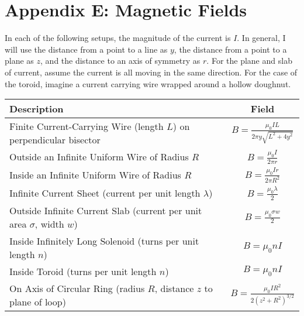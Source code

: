 \section*{Appendix E: Magnetic Fields}
In each of the following setups, the magnitude of the current is $I$. In general, I will use the distance from a point to a line as $y$, the distance from a point to a plane as $z$, and the distance to an axis of symmetry as $r$. For the plane and slab of current, assume the current is all moving in the same direction. For the case of the toroid, imagine a current carrying wire wrapped around a hollow doughnut. 
\begin{center}
	\begin{tabular}{p{10cm} c}
		\centering Description & Field \\ \hline \hline \noalign{\smallskip}
		\centering Finite Current-Carrying Wire (length $L$) on perpendicular bisector& $B = \frac{\mu_0IL}{2\pi y\sqrt{L^2 + 4y^2}}$\\[3pt]  \hline \noalign{\smallskip}
		\centering Outside an Infinite Uniform Wire of Radius $R$ & $B = \frac{\mu_0I}{2\pi r}$\\[3pt]  \hline \noalign{\smallskip}
		\centering Inside an Infinite Uniform Wire of Radius $R$ & $B = \frac{\mu_0Ir}{2\pi R^2}$\\[3pt]  \hline \noalign{\smallskip}
		\centering Infinite Current Sheet (current per unit length $\lambda$) & $B = \frac{\mu_0 \lambda}{2}$\\[3pt]  \hline \noalign{\smallskip}
		\centering Outside Infinite Current Slab (current per unit area $\sigma$, width $w$) & $B = \frac{\mu_0\sigma w}{2}$\\[3pt]  \hline \noalign{\smallskip}
		\centering Inside Infinitely Long Solenoid (turns per unit length $n$) & $B = \mu_0nI$\\[3pt]  \hline \noalign{\smallskip}
		\centering Inside Toroid (turns per unit length $n$) & $B = \mu_0 nI$\\[3pt]  \hline \noalign{\smallskip}
		\centering On Axis of Circular Ring (radius $R$, distance $z$ to plane of loop) & $B = \frac{\mu_0 IR^2}{2(z^2+R^2)^{3/2}}$\\[3pt]  \hline \hline
	\end{tabular}
\end{center}